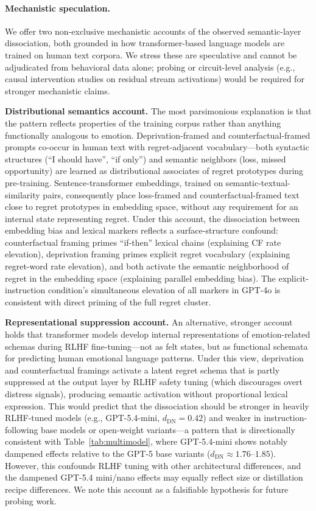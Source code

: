 \documentclass[11pt]{article}
\begin{document}
\paragraph{Mechanistic speculation.}
We offer two non-exclusive mechanistic accounts of the observed semantic-layer dissociation, both grounded in how transformer-based language models are trained on human text corpora. We stress these are speculative and cannot be adjudicated from behavioral data alone; probing or circuit-level analysis (e.g., causal intervention studies on residual stream activations) would be required for stronger mechanistic claims.

\textbf{Distributional semantics account.} The most parsimonious explanation is that the pattern reflects properties of the training corpus rather than anything functionally analogous to emotion. Deprivation-framed and counterfactual-framed prompts co-occur in human text with regret-adjacent vocabulary---both syntactic structures (``I should have'', ``if only'') and semantic neighbors (loss, missed opportunity) are learned as distributional associates of regret prototypes during pre-training. Sentence-transformer embeddings, trained on semantic-textual-similarity pairs, consequently place loss-framed and counterfactual-framed text close to regret prototypes in embedding space, without any requirement for an internal state representing regret. Under this account, the dissociation between embedding bias and lexical markers reflects a surface-structure confound: counterfactual framing primes ``if-then'' lexical chains (explaining CF rate elevation), deprivation framing primes explicit regret vocabulary (explaining regret-word rate elevation), and both activate the semantic neighborhood of regret in the embedding space (explaining parallel embedding bias). The explicit-instruction condition's simultaneous elevation of all markers in GPT-4o is consistent with direct priming of the full regret cluster.

\textbf{Representational suppression account.} An alternative, stronger account holds that transformer models develop internal representations of emotion-related schemas during RLHF fine-tuning---not as felt states, but as functional schemata for predicting human emotional language patterns. Under this view, deprivation and counterfactual framings activate a latent regret schema that is partly suppressed at the output layer by RLHF safety tuning (which discourages overt distress signals), producing semantic activation without proportional lexical expression. This would predict that the dissociation should be stronger in heavily RLHF-tuned models (e.g., GPT-5.4-mini, $d_\text{DN}=0.42$) and weaker in instruction-following base models or open-weight variants---a pattern that is directionally consistent with Table~\ref{tab:multimodel}, where GPT-5.4-mini shows notably dampened effects relative to the GPT-5 base variants ($d_\text{DN}\approx1.76$--$1.85$). However, this confounds RLHF tuning with other architectural differences, and the dampened GPT-5.4 mini/nano effects may equally reflect size or distillation recipe differences. We note this account as a falsifiable hypothesis for future probing work.
\end{document}
